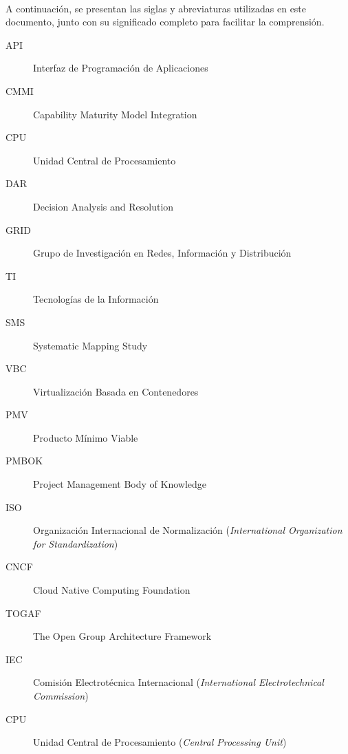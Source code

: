 \label{cap:siglas}
\mbox{}\\
A continuación, se presentan las siglas y abreviaturas utilizadas en este documento, junto con su significado completo para facilitar la comprensión.
\begin{description}
  \item[API] Interfaz de Programación de Aplicaciones
  \item[CMMI] Capability Maturity Model Integration
  \item[CPU] Unidad Central de Procesamiento
  \item[DAR] Decision Analysis and Resolution
  \item[GRID] Grupo de Investigación en Redes, Información y Distribución
  \item[TI] Tecnologías de la Información
  \item[SMS] Systematic Mapping Study
  \item[VBC] Virtualización Basada en Contenedores
  \item[PMV] Producto Mínimo Viable
  \item[PMBOK] Project Management Body of Knowledge
  \item[ISO] Organización Internacional de Normalización (\textit{International Organization for Standardization})
  \item[CNCF] Cloud Native Computing Foundation
  \item[TOGAF] The Open Group Architecture Framework
  \item[IEC] Comisión Electrotécnica Internacional (\textit{International Electrotechnical Commission})
  \item[CPU] Unidad Central de Procesamiento (\textit{Central Processing Unit})
\end{description}